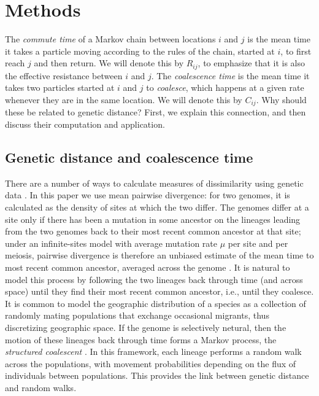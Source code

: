 \documentclass{article}
\begin{document}
\section*{Methods}


The \emph{commute time} of a Markov chain between locations $i$ and $j$
is the mean time it takes a particle moving according to the rules of the chain, 
started at $i$, to first reach $j$ and then return.
We will denote this by $R_{ij}$, to emphasize that it is also the effective resistance
between $i$ and $j$.
The \emph{coalescence time} is the mean time it takes two particles started at $i$ and $j$
to \emph{coalesce},
which happens at a given rate whenever they are in the same location.
We will denote this by $C_{ij}$.
Why should these be related to genetic distance? 
First, we explain this connection,
and then discuss their computation and application.


\subsection*{Genetic distance and coalescence time}

There are a number of ways to calculate measures of dissimilarity using genetic data \citep{distances}.
In this paper we use mean pairwise divergence:
for two genomes, it is calculated as the density of sites at which the two differ.
The genomes differ at a site only if there has been a mutation in some ancestor on the lineages leading
from the two genomes back to their most recent common ancestor at that site;
under an infinite-sites model with average mutation rate $\mu$ per site and per meiosis,
pairwise divergence is therefore an unbiased estimate of the mean time to most recent common ancestor,
averaged across the genome \citep{hudson2007variance,ralphXX}.
It is natural to model this process by following the two lineages back through time
(and across space)
until they find their most recent common ancestor,
i.e., until they coalesce.
It is common to model the geographic distribution of a species
as a collection of randomly mating populations
that exchange occasional migrants,
thus discretizing geographic space.
If the genome is selectively netural,
then the motion of these lineages back through time
forms a Markov process, the \emph{structured coalescent} \citep{wakeley2005coalescent}.
In this framework, each lineage performs a random walk across the populations,
with movement probabilities depending on the flux of individuals between populations.
This provides the link between genetic distance and random walks.
\end{document}

